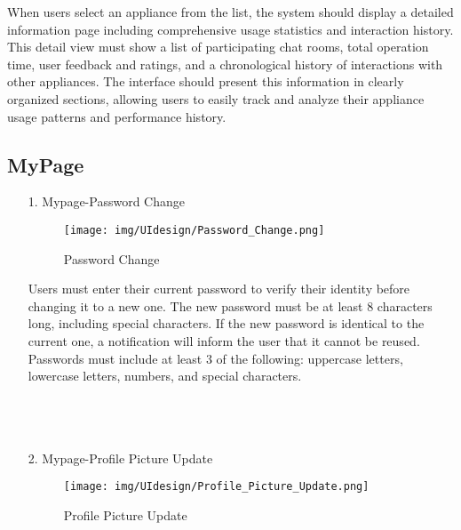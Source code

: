 \documentclass[conference]{IEEEtran}
\begin{document}
\begin{enumerate}
\begin{itemize}
\begin{itemize}
\begin{enumerate}
\begin{enumerate}
    When users select an appliance from the list, the system should display a detailed information page including comprehensive usage statistics and interaction history. This detail view must show a list of participating chat rooms, total operation time, user feedback and ratings, and a chronological history of interactions with other appliances. The interface should present this information in clearly organized sections, allowing users to easily track and analyze their appliance usage patterns and performance history. \\ 
\end{enumerate}

    
\subsection{MyPage}

\begin{enumerate}
    \item[1.] Mypage-Password Change
    \begin{figure}[h]
        {\centering
        \hspace{4cm}
        \begin{minipage}{0.4\columnwidth}
            \texttt{[image: img/UIdesign/Password\_Change.png]}
            \caption{Password Change}
        \end{minipage}}
    \end{figure}

    Users must enter their current password to verify their identity before changing it to a new one. The new password must be at least 8 characters long, including special characters. If the new password is identical to the current one, a notification will inform the user that it cannot be reused. Passwords must include at least 3 of the following: uppercase letters, lowercase letters, numbers, and special characters. \\ \\ \\ \\
\end{enumerate}

\begin{enumerate}
    \item[2.] Mypage-Profile Picture Update
    \begin{figure}[h]
        {\centering
        \hspace{4cm}
        \begin{minipage}{0.4\columnwidth}
            \texttt{[image: img/UIdesign/Profile\_Picture\_Update.png]}
            \caption{Profile Picture Update}
        \end{minipage}}
    \end{figure}


\end{enumerate}
\end{enumerate}
\end{itemize}
\end{itemize}
\end{enumerate}
\end{document}
